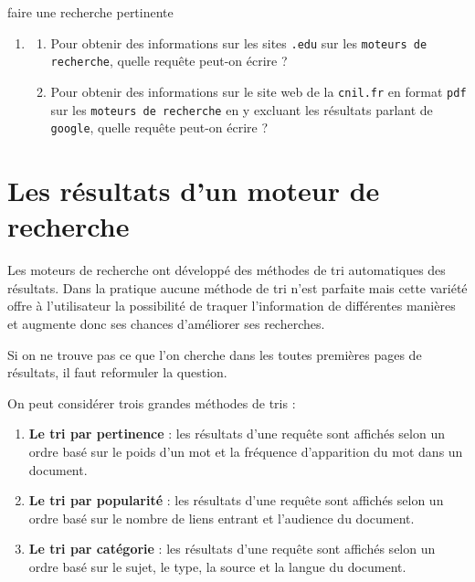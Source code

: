 \documentclass[a4paper, dvipsnames]{article}
\begin{document}
\begin{activite}[breakable]{faire une recherche pertinente}{}
\begin{enumerate}
\begin{enumerate}
\begin{center}
	  \end{center}
	  Combien de résultats obtient-on ? \dotfill\\
	  Quelle est la particularité des liens affichés dans les résultats de la recherche ?
	\item Effectuer la recherche suivante :
	  \begin{center}
	    \verb|filetype:pdf "réchauffement climatique" "en France" site:gov|
	  \end{center}
	  Combien de résultats obtient-on ? \dotfill\\
	  Quelle est la particularité des liens affichés dans les résultats de la recherche ?
      \end{enumerate}
    \item 
      \begin{enumerate}
	\item Pour obtenir des informations sur les sites \verb|.edu| sur les \verb|moteurs de recherche|, quelle requête peut-on écrire ?
	\item Pour obtenir des informations sur le site web de la \verb|cnil.fr| en format \verb|pdf| sur les \verb|moteurs de recherche| en y excluant les résultats parlant de \verb|google|, quelle requête peut-on écrire ?
      \end{enumerate}
  \end{enumerate} 
\end{activite}

\section{Les résultats d'un moteur de recherche}

Les moteurs de recherche ont développé des méthodes de tri automatiques des résultats. Dans la pratique aucune méthode de tri n’est parfaite mais cette variété offre à l’utilisateur la possibilité de traquer l’information de différentes manières et augmente donc ses chances d’améliorer ses recherches.

\medskip

Si on ne trouve pas ce que l’on cherche dans les toutes premières pages de résultats, il faut reformuler la question. 

\medskip

On peut considérer trois grandes méthodes de tris :

\begin{enumerate}
  \item \textbf{Le tri par pertinence} : les résultats d’une requête sont affichés selon un ordre basé sur le poids d’un mot et la fréquence d’apparition du mot dans un document.
  \item \textbf{Le tri par popularité} : les résultats d’une requête sont affichés selon un ordre basé sur le nombre de liens entrant et l’audience du document.
  \item \textbf{Le tri par catégorie} : les résultats d’une requête sont affichés selon un ordre basé sur le sujet, le type, la source et la langue du document.
\end{enumerate}
\end{document}
